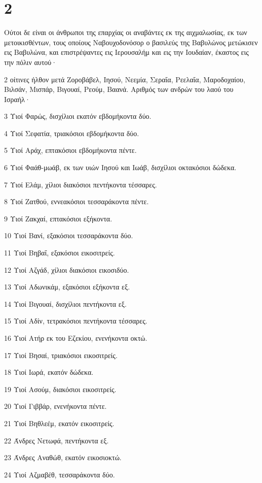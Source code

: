\chapter{2}

\par Ούτοι δε είναι οι άνθρωποι της επαρχίας οι αναβάντες εκ της αιχμαλωσίας, εκ των μετοικισθέντων, τους οποίους Ναβουχοδονόσορ ο βασιλεύς της Βαβυλώνος μετώκισεν εις Βαβυλώνα, και επιστρέψαντες εις Ιερουσαλήμ και εις την Ιουδαίαν, έκαστος εις την πόλιν αυτού·
\par 2 οίτινες ήλθον μετά Ζοροβάβελ, Ιησού, Νεεμία, Σεραΐα, Ρεελαΐα, Μαροδοχαίου, Βιλσάν, Μισπάρ, Βιγουαί, Ρεούμ, Βαανά. Αριθμός των ανδρών του λαού του Ισραήλ·
\par 3 Υιοί Φαρώς, δισχίλιοι εκατόν εβδομήκοντα δύο.
\par 4 Υιοί Σεφατία, τριακόσιοι εβδομήκοντα δύο.
\par 5 Υιοί Αράχ, επτακόσιοι εβδομήκοντα πέντε.
\par 6 Υιοί Φαάθ-μωάβ, εκ των υιών Ιησού και Ιωάβ, δισχίλιοι οκτακόσιοι δώδεκα.
\par 7 Υιοί Ελάμ, χίλιοι διακόσιοι πεντήκοντα τέσσαρες.
\par 8 Υιοί Ζατθού, εννεακόσιοι τεσσαράκοντα πέντε.
\par 9 Υιοί Ζακχαί, επτακόσιοι εξήκοντα.
\par 10 Υιοί Βανί, εξακόσιοι τεσσαράκοντα δύο.
\par 11 Υιοί Βηβαΐ, εξακόσιοι εικοσιτρείς.
\par 12 Υιοί Αζγάδ, χίλιοι διακόσιοι εικοσιδύο.
\par 13 Υιοί Αδωνικάμ, εξακόσιοι εξήκοντα εξ.
\par 14 Υιοί Βιγουαί, δισχίλιοι πεντήκοντα εξ.
\par 15 Υιοί Αδίν, τετρακόσιοι πεντήκοντα τέσσαρες.
\par 16 Υιοί Ατήρ εκ του Εζεκίου, ενενήκοντα οκτώ.
\par 17 Υιοί Βησαί, τριακόσιοι εικοσιτρείς.
\par 18 Υιοί Ιωρά, εκατόν δώδεκα.
\par 19 Υιοί Ασούμ, διακόσιοι εικοσιτρείς.
\par 20 Υιοί Γιββάρ, ενενήκοντα πέντε.
\par 21 Υιοί Βηθλεέμ, εκατόν εικοσιτρείς.
\par 22 Άνδρες Νετωφά, πεντήκοντα εξ.
\par 23 Άνδρες Αναθώθ, εκατόν εικοσιοκτώ.
\par 24 Υιοί Αζμαβέθ, τεσσαράκοντα δύο.
